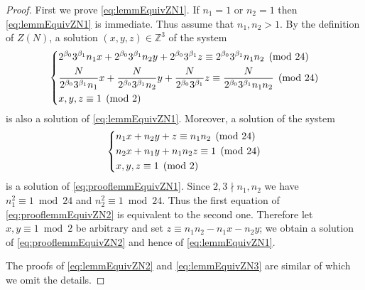 \documentclass[12pt]{amsart}
\numberwithin{equation}{section}
\theoremstyle{plain}
\theoremstyle{definition}
\theoremstyle{remark}
\newcommand\numZ{\mathbb{Z}}
\begin{document}
\begin{proof}
First we prove \eqref{eq:lemmEquivZN1}. If $n_1=1$ or $n_2=1$ then \eqref{eq:lemmEquivZN1} is immediate. Thus assume that $n_1,n_2>1$. By the definition of $Z(N)$, a solution $(x,y,z)\in\numZ^3$ of the system
\begin{equation}
\label{eq:prooflemmEquivZN1}
\begin{dcases}
2^{\beta_0}3^{\beta_1}n_1x+2^{\beta_0}3^{\beta_1}n_2y+2^{\beta_0}3^{\beta_1}z \equiv 2^{\beta_0}3^{\beta_1}n_1n_2 \pmod{24}\\
\frac{N}{2^{\beta_0}3^{\beta_1}n_1}x+\frac{N}{2^{\beta_0}3^{\beta_1}n_2}y+\frac{N}{2^{\beta_0}3^{\beta_1}}z \equiv \frac{N}{2^{\beta_0}3^{\beta_1}n_1n_2} \pmod{24}\\
x,y,z\equiv 1 \pmod 2
\end{dcases}
\end{equation}
is also a solution of \eqref{eq:lemmEquivZN1}. Moreover, a solution of the system
\begin{equation}
\label{eq:prooflemmEquivZN2}
\begin{dcases}
n_1x+n_2y+z \equiv n_1n_2 \pmod{24}\\
n_2x+n_1y+n_1n_2z \equiv 1 \pmod{24}\\
x,y,z\equiv 1 \pmod 2
\end{dcases}
\end{equation}
is a solution of \eqref{eq:prooflemmEquivZN1}. Since $2,3\nmid n_1,n_2$ we have $n_1^2\equiv 1\bmod 24$ and $n_2^2\equiv 1\bmod 24$. Thus the first equation of \eqref{eq:prooflemmEquivZN2} is equivalent to the second one. Therefore let $x,y\equiv 1 \bmod 2$ be arbitrary and set $z\equiv n_1n_2-n_1x-n_2y$; we obtain a solution of \eqref{eq:prooflemmEquivZN2} and hence of \eqref{eq:lemmEquivZN1}.

The proofs of \eqref{eq:lemmEquivZN2} and \eqref{eq:lemmEquivZN3} are similar of which we omit the details.
\end{proof}
\end{document}
